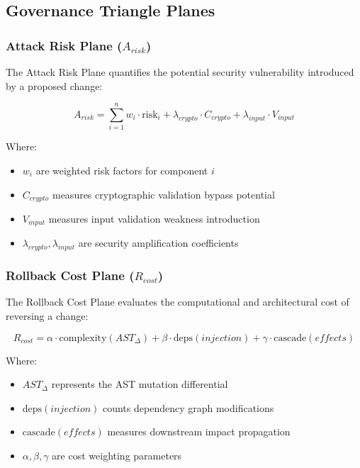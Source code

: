 \subsection{Governance Triangle Planes}

\subsubsection{Attack Risk Plane ($A_{risk}$)}

The Attack Risk Plane quantifies the potential security vulnerability introduced by a proposed change:

\begin{equation}
A_{risk} = \sum_{i=1}^{n} w_i \cdot \text{risk}_i + \lambda_{crypto} \cdot C_{crypto} + \lambda_{input} \cdot V_{input}
\end{equation}

Where:
\begin{itemize}
    \item $w_i$ are weighted risk factors for component $i$
    \item $C_{crypto}$ measures cryptographic validation bypass potential
    \item $V_{input}$ measures input validation weakness introduction
    \item $\lambda_{crypto}, \lambda_{input}$ are security amplification coefficients
\end{itemize}

\subsubsection{Rollback Cost Plane ($R_{cost}$)}

The Rollback Cost Plane evaluates the computational and architectural cost of reversing a change:

\begin{equation}
R_{cost} = \alpha \cdot \text{complexity}(AST_{\Delta}) + \beta \cdot \text{deps}(injection) + \gamma \cdot \text{cascade}(effects)
\end{equation}

Where:
\begin{itemize}
    \item $AST_{\Delta}$ represents the AST mutation differential
    \item $\text{deps}(injection)$ counts dependency graph modifications
    \item $\text{cascade}(effects)$ measures downstream impact propagation
    \item $\alpha, \beta, \gamma$ are cost weighting parameters
\end{itemize}

